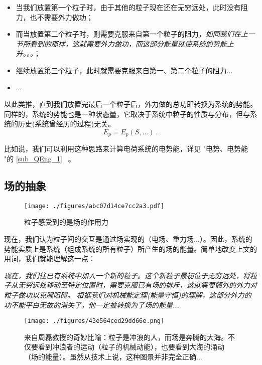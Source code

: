 \begin{itemize}
\item 当我们放置第一个粒子时，由于其他的粒子现在还在无穷远处，此时没有阻力，也不需要外力做功；
\item 而当放置第二个粒子时，则需要克服来自第一个粒子的阻力，\textsl{如同我们在上一节所看到的那样，这就需要外力做功，而这部分能量就使系统的势能上升。。。}；
\item 继续放置第三个粒子，此时就需要克服来自第一、第二个粒子的阻力...
\item ...
\end{itemize}
以此类推，直到我们放置完最后一个粒子后，外力做的总功即转换为系统的势能。
同样的，系统的势能也是一种状态量，它取决于系统中粒子的性质与分布，但与系统的历史(系统曾经历的过程)无关。
$$E_p=E_p(S,...)~.$$

比如说，我们可以利用这种思路来计算电荷系统的电势能，详见 "电势、电势能 "的 \autoref{sub_QEng_1}~ 。

\subsection{场的抽象}
\begin{figure}[ht]
\centering
\texttt{[image: ./figures/abc07d14ce7cc2a3.pdf]}
\caption{粒子感受到的是场的作用力} \label{fig_POTENT_3}
\end{figure}
现在，我们认为粒子间的交互是通过场实现的（电场、重力场...）。因此，系统的势能实质上是系统（组成系统的所有粒子）所产生的场的能量。简单地改变上文的用词，我们就能理解这一点：

\textsl{现在，我们往已有系统中加入一个新的粒子。这个新粒子最初位于无穷远处，将粒子从无穷远处移动至特定位置时，需要克服已有场的排斥，这就需要额外的外力对粒子做功以克服阻碍。 根据我们对机械能定理(能量守恒)的理解，这部分外力的功不能平白无故的消失了，他一定被转换为了场的能量...}

\begin{figure}[ht]
\centering
\texttt{[image: ./figures/43e564ced29dd66e.png]}
\caption{来自周磊教授的奇妙比喻：粒子是冲浪的人，而场是奔腾的大海。不仅要看到冲浪者的运动（粒子的机械动能），也要看到大海的涌动（场的能量）。虽然从技术上说，这种图景并非完全正确...} \label{fig_POTENT_5}
\end{figure}
